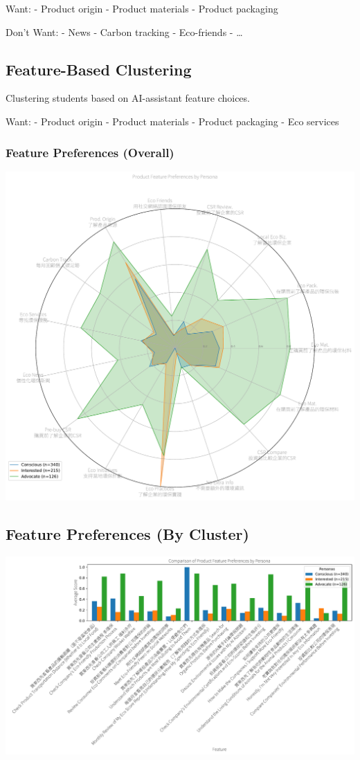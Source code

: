 \documentclass[
  letterpaper,
  DIV=11,
  numbers=noendperiod]{scrartcl}
\begin{document}
Want: - Product origin - Product materials - Product packaging

Don't Want: - News - Carbon tracking - Eco-friends - \ldots{}

\subsection{Feature-Based Clustering}\label{feature-based-clustering}

Clustering students based on AI-assistant feature choices.

Want: - Product origin - Product materials - Product packaging - Eco
services

\subsubsection{Feature Preferences
(Overall)}\label{feature-preferences-overall}

\includegraphics{_thesis_files/figure-pdf/cell-33-output-1.pdf}

\subsection{Feature Preferences (By
Cluster)}\label{feature-preferences-by-cluster}

\includegraphics{_thesis_files/figure-pdf/cell-34-output-1.pdf}
\end{document}
